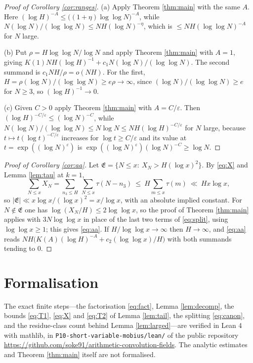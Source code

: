 \documentclass[11pt,a4paper]{article}
\theoremstyle{plain}
\theoremstyle{remark}
\newcommand{\eps}{\varepsilon}
\begin{document}
\begin{proof}[Proof of Corollary \ref{cor:ranges}]
(a) Apply Theorem \ref{thm:main} with the same $A$. Here
$(\log H)^{-A}\le\bigl((1+\eta)\log\log N\bigr)^{-A}$, while $N(\log N)/(\log\log N)\le
NH(\log N)^{-\eta}$, which is $\le NH(\log\log N)^{-A}$ for $N$ large.

(b) Put $\rho=H\log\log N/\log N$ and apply Theorem \ref{thm:main} with $A=1$, giving
$K(1)NH(\log H)^{-1}+c_1N(\log N)/(\log\log N)$. The second summand is $c_1NH/\rho=o(NH)$. For the
first, $H=\rho(\log N)/(\log\log N)\ge e\rho\to\infty$, since $(\log N)/(\log\log N)\ge e$ for
$N\ge3$, so $(\log H)^{-1}\to0$.

(c) Given $C>0$ apply Theorem \ref{thm:main} with $A=C/\eps$. Then
$(\log H)^{-C/\eps}\le(\log N)^{-C}$, while
$N(\log N)/(\log\log N)\le N\log N\le NH(\log H)^{-C/\eps}$ for $N$ large, because
$t\mapsto t(\log t)^{-C/\eps}$ increases for $\log t\ge C/\eps$ and its value at
$t=\exp((\log N)^{\eps})$ is $\exp((\log N)^{\eps})(\log N)^{-C}\ge\log N$.
\end{proof}

\begin{proof}[Proof of Corollary \ref{cor:aa}]
Let $\mathfrak E=\{N\le x:\ X_N>H(\log x)^{2}\}$. By \eqref{eq:X} and Lemma \ref{lem:tau} at $k=1$,
\[
  \sum_{N\le x}X_N=\sum_{n_3\le H}\ \sum_{N\le x}\tau(N-n_3)\ \le\ H\sum_{m\le x}\tau(m)
  \ \ll\ Hx\log x ,
\]
so $|\mathfrak E|\ll x\log x/(\log x)^{2}=x/\log x$, with an absolute implied constant. For
$N\notin\mathfrak E$ one has $\log(X_N/H)\le2\log\log x$, so the proof of Theorem \ref{thm:main}
applies with $3N\log\log x$ in place of the last two terms of \eqref{eq:split}, using
$\log\log x\ge1$; this gives \eqref{eq:aa}. If $H/\log\log x\to\infty$ then $H\to\infty$, and
\eqref{eq:aa} reads $NH\bigl(K(A)(\log H)^{-A}+c_2(\log\log x)/H\bigr)$ with both summands tending to
$0$.
\end{proof}

\section*{Formalisation}
The exact finite steps---the factorisation \eqref{eq:fact},
Lemma \ref{lem:decomp}, the bounds \eqref{eq:T1}, \eqref{eq:X} and \eqref{eq:T2} of Lemma
\ref{lem:tail}, the splitting \eqref{eq:canon}, and the residue-class count behind Lemma
\ref{lem:larged}---are verified in Lean 4 with mathlib, in
\texttt{P10-short-variable-mobius/lean/} of the public repository
\url{https://github.com/soke91/arithmetic-convolution-fields}. The analytic estimates and
Theorem \ref{thm:main} itself are not formalised.
\end{document}
